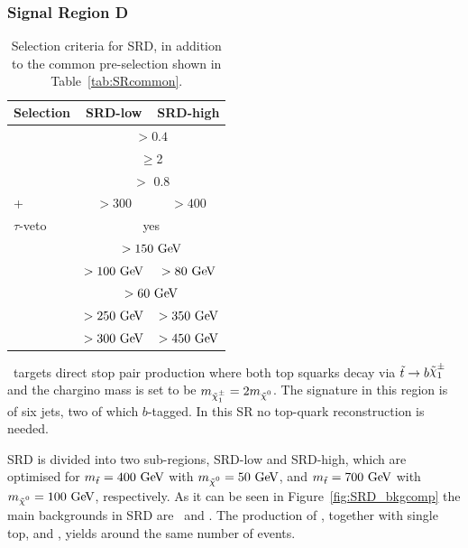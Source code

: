 			\subsubsection*{Signal Region D}

				\begin{table}[!htb]
				  \caption{Selection criteria for SRD, in addition to the common pre-selection shown in Table~\ref{tab:SRcommon}.}
				  \begin{center}
				  \def\arraystretch{1.4}
				  \begin{tabular}{lcc}
				    \toprule
				    {\textbf{Selection}}       & {\textbf{SRD-low}} & {\textbf{SRD-high}} \\
				    \toprule
				    \dphijetthreemet     & \multicolumn{2}{c}{$>0.4$}     \\ %
				    \nBJet      & \multicolumn{2}{c}{$\geq$2}    \\%
				    \drbjetbjet     & \multicolumn{2}{c}{$>$ 0.8}    \\ %
				    \ptbzero+\ptbone & $>300$ \gev    & $>400$ \gev     \\ %
				    $\tau$-veto          & \multicolumn{2}{c}{yes}        \\ %
				    \ptone\              & \multicolumn{2}{c}{$>150\GeV$} \\ %
				    \ptthree\            & $>100\GeV$    & $>80\GeV$      \\ %
				    \ptfour\             & \multicolumn{2}{c}{$>60\GeV$}  \\ %
				    \mtbmin\             & $>250\GeV$    & $>350\GeV$     \\ %
				    \mtbmax\             & $>300\GeV$    & $>450\GeV$     \\ 
				    \bottomrule
				  \end{tabular}
				  \end{center}
				  \label{tab:SignalRegionD}
				\end{table}
				
				\SRD\ targets direct stop pair production where both top squarks decay via $\stop\to b \chinoonepm$ and the chargino mass is set to be $m_{\chinoonepm}=2\mLSP$. The signature in this region is of six jets, two of which $b$-tagged. In this \ac{SR} no top-quark reconstruction is needed. 

				SRD is divided into two sub-regions, SRD-low and SRD-high, which are optimised for $\mstop = 400\GeV$ with $\mLSP=50\GeV$, and $\mstop = 700\GeV$ with $\mLSP=100\GeV$, respectively. As it can be seen in Figure~\ref{fig:SRD_bkgcomp} the main backgrounds in SRD are \Zjets\ and \Wjets. The production of \ttbar, together with single top, and \ttV, yields around the same number of events.

